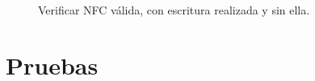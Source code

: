 \documentclass[../PFC.tex]{subfiles}
\begin{document}
\begin{figure}[H]
  \centering
  \null\hfill
  \caption{Verificar NFC válida, con escritura realizada y sin ella.}
  \label{img:app:verificarNFC2}
\end{figure}

\section{Pruebas}
\label{App:Pruebas}
\end{document}
